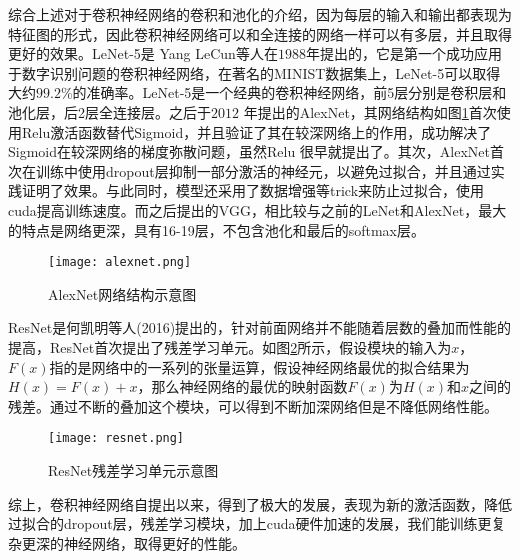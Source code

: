 综合上述对于卷积神经网络的卷积和池化的介绍，因为每层的输入和输出都表现为特征图的形式，因此卷积神经网络可以和全连接的网络一样可以有多层，并且取得更好的效果。LeNet-5\cite{lecun1998gradient-based}是
Yang LeCun等人在$1988$年提出的，它是第一个成功应用于数字识别问题的卷积神经网络，在著名的MINIST数据集上，LeNet-5可以取得大约$99.2\%$的准确率。LeNet-5是一个经典的卷积神经网络，前5层分别是卷积层和池化层，后2层全连接层。之后于$2012$ 年提出的AlexNet\cite{DBLP:conf/nips/KrizhevskySH12}，其网络结构如图\ref{fig:alexnet-example}首次使用Relu激活函数替代Sigmoid，并且验证了其在较深网络上的作用，成功解决了Sigmoid在较深网络的梯度弥散问题，虽然Relu 很早就提出了。其次，AlexNet首次在训练中使用dropout层抑制一部分激活的神经元，以避免过拟合，并且通过实践证明了效果。与此同时，模型还采用了数据增强等trick来防止过拟合，使用cuda提高训练速度。而之后提出的VGG\cite{DBLP:journals/corr/SimonyanZ14a}，相比较与之前的LeNet和AlexNet，最大的特点是网络更深，具有16-19层，不包含池化和最后的softmax层。
\begin{figure}[htpb]
	\centering
	\texttt{[image: alexnet.png]}
    \caption{AlexNet网络结构示意图}
	\vspace*{-3.5mm}
	\label{fig:alexnet-example}
\end{figure}
ResNet\cite{DBLP:conf/cvpr/HeZRS16}是何凯明等人(2016)提出的，针对前面网络并不能随着层数的叠加而性能的提高，ResNet首次提出了残差学习单元。如图\ref{fig:resnet-example}所示，假设模块的输入为$x$，$F(x)$指的是网络中的一系列的张量运算，假设神经网络最优的拟合结果为$H(x) = F(x) + x$，那么神经网络的最优的映射函数$F(x)$为$H(x)$和$x$之间的残差。通过不断的叠加这个模块，可以得到不断加深网络但是不降低网络性能。
\begin{figure}[htpb]
	\centering
	\texttt{[image: resnet.png]}
    \caption{ResNet残差学习单元示意图}
	\vspace*{-3.5mm}
	\label{fig:resnet-example}
\end{figure}

综上，卷积神经网络自提出以来，得到了极大的发展，表现为新的激活函数，降低过拟合的dropout层，残差学习模块，加上cuda硬件加速的发展，我们能训练更复杂更深的神经网络，取得更好的性能。

